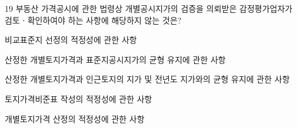 \begin{question}{19}
부동산 가격공시에 관한 법령상 개별공시지가의 검증을 의뢰받은 감정평가업자가 검토ㆍ확인하여야 하는 사항에 해당하지 않는 것은?
\begin{choices}
  \item 비교표준지 선정의 적정성에 관한 사항
  \item 산정한 개별토지가격과 표준지공시지가의 균형 유지에 관한 사항
  \item 산정한 개별토지가격과 인근토지의 지가 및 전년도 지가와의 균형 유지에 관한 사항
  \item 토지가격비준표 작성의 적정성에 관한 사항
  \item 개별토지가격 산정의 적정성에 관한 사항
\end{choices}
\end{question}
